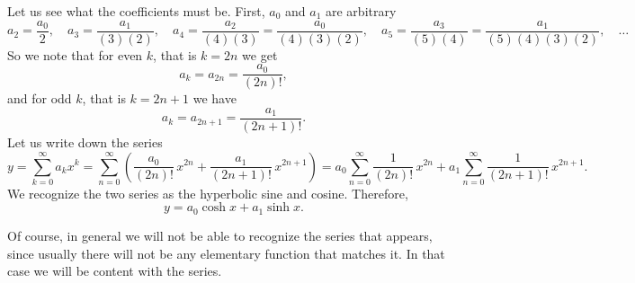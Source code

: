 \begin{example}
Let us see what the coefficients
must be.  First, $a_0$ and $a_1$ are arbitrary
\begin{equation*}
a_2 = \frac{a_0}{2}, \quad
a_3 = \frac{a_1}{(3)(2)}, \quad
a_4 = \frac{a_2}{(4)(3)} = \frac{a_0}{(4)(3)(2)}, \quad
a_5 = \frac{a_3}{(5)(4)} = \frac{a_1}{(5)(4)(3)(2)}, \quad \ldots
\end{equation*}
So we note that for even $k$, that is $k=2n$
we get
\begin{equation*}
a_k = a_{2n} = \frac{a_0}{(2n)!} ,
\end{equation*}
and for odd $k$, that is $k=2n+1$ we have
\begin{equation*}
a_k = a_{2n+1} = \frac{a_1}{(2n+1)!} .
\end{equation*}
Let us write down the series
\begin{equation*}
y =
\sum_{k=0}^\infty
a_k x^k
=
\sum_{n=0}^\infty
\left(
\frac{a_0}{(2n)!} \,x^{2n}
+
\frac{a_1}{(2n+1)!} \,x^{2n+1}
\right)
=
a_0
\sum_{n=0}^\infty
\frac{1}{(2n)!} \,x^{2n}
+
a_1
\sum_{n=0}^\infty
\frac{1}{(2n+1)!} \,x^{2n+1} .
\end{equation*}
We recognize the two series as the hyperbolic sine and cosine.
Therefore,
\begin{equation*}
y =
a_0 \cosh x + a_1 \sinh x .
\end{equation*}
\end{example}

Of course, in general we will not be able to recognize 
the series that appears, since usually there will not be
any elementary function that matches it.  In that case we will be
content with the series.

